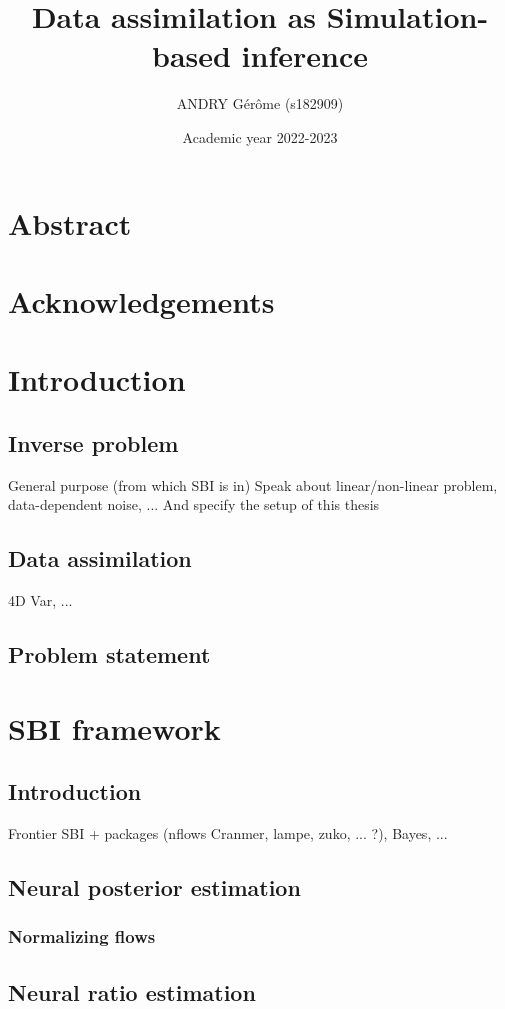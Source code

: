 \documentclass[a4paper, 12pt]{article}
\title{Data assimilation as Simulation-based inference}
\author{ANDRY Gérôme (s182909)}
\date{Academic year 2022-2023}
\begin{document}
\maketitle

\newpage
\section*{Abstract}


\newpage
\section*{Acknowledgements}

\newpage
\tableofcontents
\newpage


\section{Introduction}
\subsection{Inverse problem}
General purpose (from which SBI is in)
Speak about linear/non-linear problem, data-dependent noise, ... 
And specify the setup of this thesis
\subsection{Data assimilation}
4D Var, ... 
\subsection{Problem statement}

\section{SBI framework}
\subsection{Introduction}
Frontier SBI + packages (nflows Cranmer, lampe, zuko, ... ?), Bayes, ...
\subsection{Neural posterior estimation}
\subsubsection{Normalizing flows}
\subsection{Neural ratio estimation}
\end{document}
